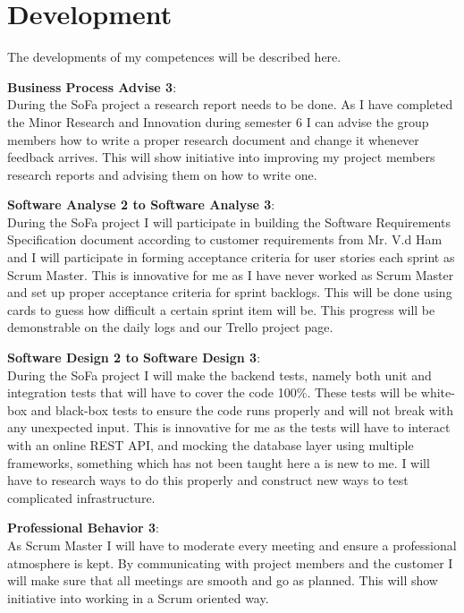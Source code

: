 \section{Development}
The developments of my competences will be described here.

\textbf{Business Process Advise 3}:\\
During the SoFa project a research report needs to be done. As I have completed the Minor Research and Innovation during semester 6 I can advise the group members how to write a proper research document and change it whenever feedback arrives. This will show initiative into improving my project members research reports and advising them on how to write one.

\textbf{Software Analyse 2 to Software Analyse 3}:\\
During the SoFa project I will participate in building the Software Requirements Specification document according to customer requirements from Mr. V.d Ham  and I will participate in forming acceptance criteria for user stories each sprint as Scrum Master. This is innovative for me as I have never worked as Scrum Master and set up proper acceptance criteria for sprint backlogs. This will be done using cards to guess how difficult a certain sprint item will be. This progress will be demonstrable on the daily logs and our Trello project page.

\textbf{Software Design 2 to Software Design 3}:\\
During the SoFa project I will make the backend tests, namely both unit and integration tests that will have to cover the code 100\%. These tests will be white-box and black-box tests to ensure the code runs properly and will not break with any unexpected input. This is innovative for me as the tests will have to interact with an online REST API, and mocking the database layer using multiple frameworks, something which has not been taught here a is new to me. I will have to research ways to do this properly and construct new ways to test complicated infrastructure.

\textbf{Professional Behavior 3}:\\
As Scrum Master I will have to moderate every meeting and ensure a professional atmosphere is kept. By communicating with project members and the customer I will make sure that all meetings are smooth and go as planned. This will show initiative into working in a Scrum oriented way.